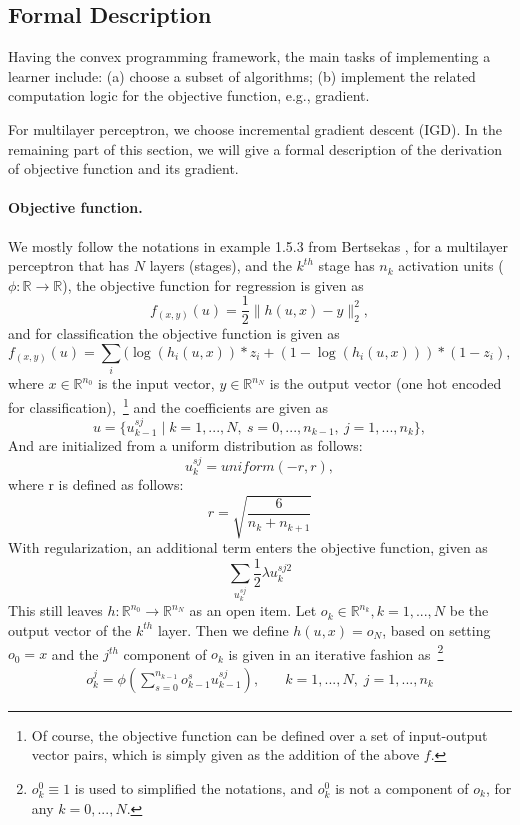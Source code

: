 \subsection{Formal Description}
Having the convex programming framework, the main tasks of implementing a learner include:
(a) choose a subset of algorithms;
(b) implement the related computation logic for the objective function, e.g., gradient.

For multilayer perceptron, we choose incremental gradient descent (IGD).
In the remaining part of this section, we will give a formal description of the derivation of objective function and its gradient.

\paragraph{Objective function.}
We mostly follow the notations in example 1.5.3 from Bertsekas \cite{bertsekas1999nonlinear}, for a multilayer perceptron that has $N$ layers (stages), and the $k^{th}$ stage has $n_k$ activation units ($\phi : \mathbb{R} \to \mathbb{R}$), the objective function for regression is given as
\[f_{(x, y)}(u) = \frac{1}{2} \|h(u, x) - y\|_2^2,\]
and for classification the objective function is given as
\[f_{(x, y)}(u) = \sum_i (\log(h_i(u, x)) * z_i + (1-\log(h_i(u, x))) *( 1- z_i) ,\]
where $x \in \mathbb{R}^{n_0}$ is the input vector, $y \in \mathbb{R}^{n_N}$ is the output vector (one hot encoded for classification),~\footnote{Of course, the objective function can be defined over a set of input-output vector pairs, which is simply given as the addition of the above $f$.}
and the coefficients are given as
\[u = \{ u_{k-1}^{sj} \; | \; k = 1,...,N, \: s = 0,...,n_{k-1}, \: j = 1,...,n_k\},\]
And are initialized from a uniform distribution as follows:
\[u_{k}^{sj} = uniform(-r,r),\]
where r is defined as follows:
\[r = \sqrt{\frac{6}{n_k+n_{k+1}}}\]
With regularization, an additional term enters the objective function, given as
\[\sum_{u_k^{sj}} \frac{1}{2} \lambda u_k^{sj2} \]
This still leaves $h : \mathbb{R}^{n_0} \to \mathbb{R}^{n_N}$ as an open item.
Let $o_k \in \mathbb{R}^{n_k}, k = 1,...,N$ be the output vector of the $k^{th}$ layer. Then we define $h(u, x) = o_N$, based on setting $o_0 = x$ and the $j^{th}$ component of $o_k$ is given in an iterative fashion as~\footnote{$o_k^0 \equiv 1$ is used to simplified the notations, and $o_k^0$ is not a component of $o_k$, for any $k = 0,...,N$.}
\[\begin{alignedat}{5}
    o_k^j = \phi \left( \sum_{s=0}^{n_{k-1}} o_{k-1}^s u_{k-1}^{sj} \right), &\quad k = 1,...,N, \; j = 1,...,n_k
\end{alignedat}\]

